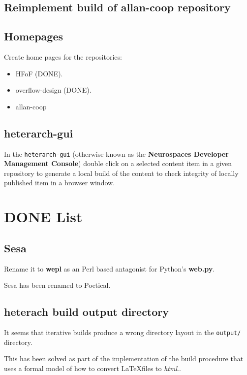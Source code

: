 \documentclass[12pt]{article}
\begin{document}
\subsection{Reimplement build of allan-coop repository}


\subsection{Homepages}

Create home pages for the repositories:
\begin{itemize}
\item HFoF (DONE).
\item overflow-design (DONE).
\item allan-coop
\end{itemize}


\subsection{heterarch-gui}

In the {\tt heterarch-gui} (otherwise known as the {\bf Neurospaces
  Developer Management Console}) double click on a selected content
item in a given repository to generate a local build of the content to
check integrity of locally published item in a browser window.


\section{DONE List}

\subsection{Sesa}

Rename it to {\bf wepl} as an Perl based antagonist for Python's {\bf
  web.py}.

Sesa has been renamed to Poetical.


\subsection{heterach build output directory}

It seems that iterative builds produce a wrong directory layout in the
{\tt output/} directory.

This has been solved as part of the implementation of the build
procedure that uses a formal model of how to convert \LaTeX files to
{\it html}..
\end{document}
